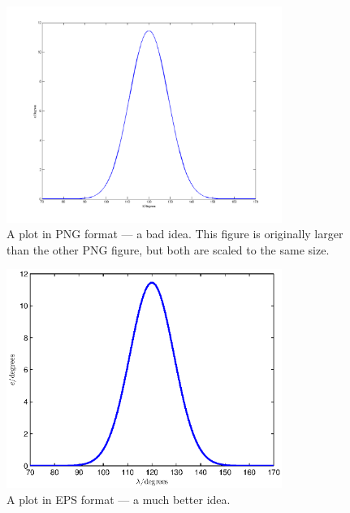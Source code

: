\begin{figure}[htb]
	\centering
		\includegraphics[width=0.8\textwidth]{figures/constraint_png_large.png}
	\caption{A plot in PNG format --- a bad idea. This figure is originally larger than the other PNG figure, but both are scaled to the same size.}
	\label{fig:constraint_png_large}
\end{figure}

\begin{figure}[htb]
	\centering
		\includegraphics[width=0.8\textwidth]{figures/constraint_eps.eps}
	\caption{A plot in EPS format --- a much better idea.}
	\label{fig:constraint_eps}
\end{figure}
